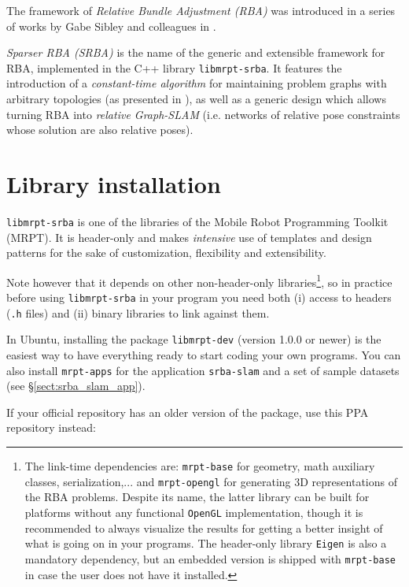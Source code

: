 \documentclass[a4paper,11pt]{article}
\begin{document}
The framework of \emph{Relative Bundle Adjustment (RBA)} was introduced in a series of works by Gabe Sibley and 
colleagues in \cite{sibley2009rba,sibley2009adaptive}. 

\emph{Sparser RBA (SRBA)} is the name of the generic and extensible framework for RBA, implemented in 
the C++ library \texttt{libmrpt-srba}. It features the introduction of 
a \emph{constant-time algorithm} for maintaining problem graphs with arbitrary topologies 
(as presented in \cite{blanco2013srba}), as well as a generic design which allows turning RBA 
into \emph{relative Graph-SLAM} (i.e. networks of relative pose constraints whose solution are also relative poses).

\section{Library installation}

\texttt{libmrpt-srba} is one of the libraries of the Mobile Robot Programming Toolkit (MRPT). 
It is header-only and makes \emph{intensive} use of templates and design patterns for the sake of customization, 
flexibility and extensibility. 

Note however that it depends on other non-header-only libraries\footnote{The link-time dependencies are: \texttt{mrpt-base} 
for geometry, math auxiliary classes, serialization,... and \texttt{mrpt-opengl} for generating 3D representations of 
the RBA problems. Despite its name, the latter library can be built for platforms without any 
functional \texttt{OpenGL} implementation, though it is recommended to always visualize the results for getting a better 
insight of what is going on in your programs. The header-only library \texttt{Eigen} \cite{eigenweb} is also a mandatory dependency, but 
an embedded version is shipped with \texttt{mrpt-base} in case the user does not have it installed.}, 
so in practice before using \texttt{libmrpt-srba} in your program you need
both (i) access to headers (\texttt{.h} files) and (ii) binary libraries to link against them. 

In Ubuntu, installing the package \texttt{libmrpt-dev} (version 1.0.0 or newer) is the easiest way to have 
everything ready to start coding your own programs. You can also install \texttt{mrpt-apps} for the application \texttt{srba-slam} 
and a set of sample datasets (see \S\ref{sect:srba_slam_app}).

If your official repository has an older version of the package, use this PPA repository instead:
\end{document}
